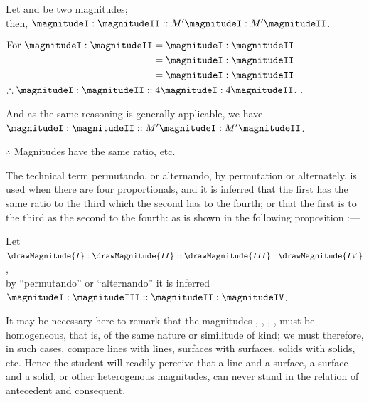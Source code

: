 \documentclass[booklanguage=english]{byrnebook}
\begin{document}
\begin{center}
Let  and  be two magnitudes;\\
then, $\magnitudeI : \magnitudeII :: M' \magnitudeI : M' \magnitudeII$.

$\begin{aligned}
\mbox{For } \magnitudeI : \magnitudeII &= \magnitudeI : \magnitudeII \\
&= \magnitudeI : \magnitudeII \\
&= \magnitudeI : \magnitudeII \\
\end{aligned}$\\
$\therefore \magnitudeI : \magnitudeII :: 4 \magnitudeI : 4 \magnitudeII$. .

And as the same reasoning is generally applicable, we have\\
$\magnitudeI : \magnitudeII :: M' \magnitudeI : M' \magnitudeII$.

$\therefore$ Magnitudes have the same ratio, etc.
\end{center}

\vfill\pagebreak

\label{def:V.XIII} 
The technical term permutando, or alternando, by permutation or alternately, is used when there are four proportionals, and it is inferred that the first has the same ratio to the third which the second has to the fourth; or that the first is to the third as the second to the fourth: as is shown in the following proposition :—

\begin{center}
Let $\drawMagnitude{I} : \drawMagnitude{II} :: \drawMagnitude{III} : \drawMagnitude{IV}$,\\
by \enquote{permutando} or \enquote{alternando} it is inferred\\
$\magnitudeI : \magnitudeIII :: \magnitudeII : \magnitudeIV$.
\end{center}

It may be necessary here to remark that the magnitudes \magnitudeI, \magnitudeII, \magnitudeIII, \magnitudeIV, must be homogeneous, that is, of the same nature or similitude of kind; we must therefore, in such cases, compare lines with lines, surfaces with surfaces, solids with solids, etc. Hence the student will readily perceive that a line and a surface, a surface and a solid, or other heterogenous magnitudes, can never stand in the relation of antecedent and consequent.
\end{document}
